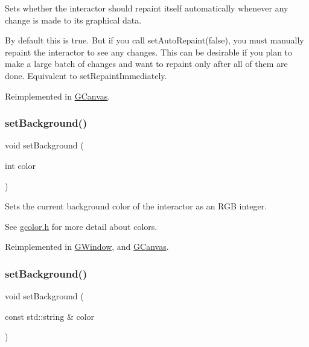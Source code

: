 Sets whether the interactor should repaint itself automatically whenever any change is made to its graphical data. 

By default this is true. But if you call set\+Auto\+Repaint(false), you must manually repaint the interactor to see any changes. This can be desirable if you plan to make a large batch of changes and want to repaint only after all of them are done. Equivalent to set\+Repaint\+Immediately. 

Reimplemented in \mbox{\hyperlink{classGCanvas_acb65220cc16d17df02a0c08d35b60988}{G\+Canvas}}.

\mbox{\label{classGDrawingSurface_aba673fd56570a074aba10fa059524b96}} 
\subsubsection{\texorpdfstring{set\+Background()}{setBackground()}\hspace{0.1cm}{\footnotesize\ttfamily [1/2]}}
{\footnotesize\ttfamily void set\+Background (\begin{DoxyParamCaption}\item[{int}]{color }\end{DoxyParamCaption})\hspace{0.3cm}{\ttfamily [virtual]}}



Sets the current background color of the interactor as an R\+GB integer. 

See \mbox{\hyperlink{gcolor_8h_source}{gcolor.\+h}} for more detail about colors. 

Reimplemented in \mbox{\hyperlink{classGWindow_a10d305826534b55561ea88730fc9f6cd}{G\+Window}}, and \mbox{\hyperlink{classGCanvas_a10d305826534b55561ea88730fc9f6cd}{G\+Canvas}}.

\mbox{\label{classGDrawingSurface_ab4677ab2474e68b07aa56605af92a84a}} 
\subsubsection{\texorpdfstring{set\+Background()}{setBackground()}\hspace{0.1cm}{\footnotesize\ttfamily [2/2]}}
{\footnotesize\ttfamily void set\+Background (\begin{DoxyParamCaption}\item[{const std\+::string \&}]{color }\end{DoxyParamCaption})\hspace{0.3cm}{\ttfamily [virtual]}}



